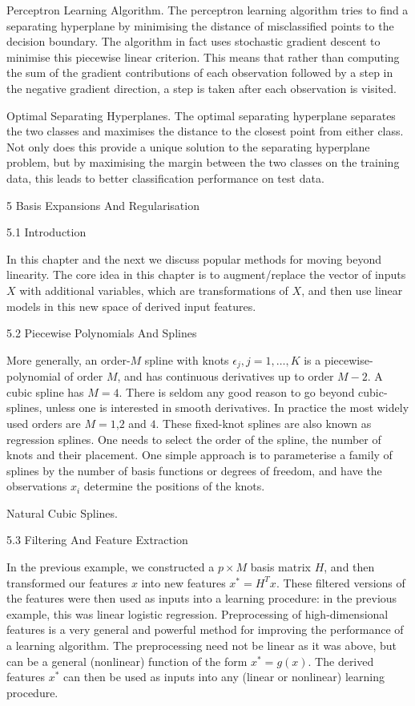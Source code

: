 Perceptron Learning Algorithm. The perceptron learning algorithm tries to find a separating hyperplane by minimising the distance of misclassified points to the decision boundary. The algorithm in fact uses stochastic gradient descent to minimise this piecewise linear criterion. This means that rather than computing the sum of the gradient contributions of each observation followed by a step in the negative gradient direction, a step is taken after each observation is visited.

Optimal Separating Hyperplanes. The optimal separating hyperplane separates the two classes and maximises the distance to the closest point from either class. Not only does this provide a unique solution to the separating hyperplane problem, but by maximising the margin between the two classes on the training data, this leads to better classification performance on test data.

5 Basis Expansions And Regularisation

5.1 Introduction

In this chapter and the next we discuss popular methods for moving beyond linearity. The core idea in this chapter is to augment/replace the vector of inputs $X$ with additional variables, which are transformations of $X$, and then use linear models in this new space of derived input features.

5.2 Piecewise Polynomials And Splines

More generally, an order-$M$ spline with knots $\epsilon_j,j=1,\dots,K$ is a piecewise-polynomial of order $M$, and has continuous derivatives up to order $M-2$. A cubic spline has $M=4$. There is seldom any good reason to go beyond cubic-splines, unless one is interested in smooth derivatives. In practice the most widely used orders are $M=1$,$2$ and $4$. These fixed-knot splines are also known as regression splines. One needs to select the order of the spline, the number of knots and their placement. One simple approach is to parameterise a family of splines by the number of basis functions or degrees of freedom, and have the observations $x_i$ determine the positions of the knots.

Natural Cubic Splines.

5.3 Filtering And Feature Extraction

In the previous example, we constructed a $p \times M$ basis matrix $H$, and then transformed our features $x$ into new features $x^* = H^T x$. These filtered versions of the features were then used as inputs into a learning procedure: in the previous example, this was linear logistic regression. Preprocessing of high-dimensional features is a very general and powerful method for improving the performance of a learning algorithm. The preprocessing need not be linear as it was above, but can be a general (nonlinear) function of the form $x^* = g(x)$. The derived features $x^*$ can then be used as inputs into any (linear or nonlinear) learning procedure.

